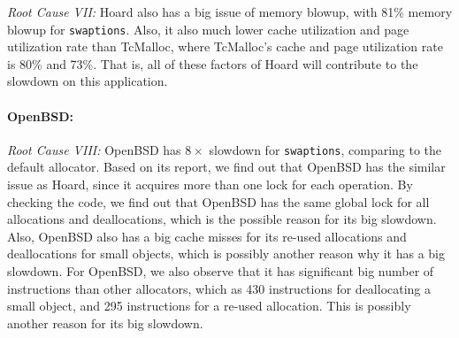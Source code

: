  \textit{Root Cause \RN{7}:} Hoard also has a big issue of memory blowup, with 81\% memory blowup for \texttt{swaptions}. Also, it also much lower cache utilization and page utilization rate than TcMalloc, where TcMalloc's cache and page utilization rate is 80\% and 73\%. That is, all of these factors of Hoard will contribute to the slowdown on this application.
 
\paragraph{OpenBSD:} \textit{Root Cause \RN{8}:}  OpenBSD has $8\times$ slowdown for \texttt{swaptions}, comparing to the default allocator. Based on its report, we find out that OpenBSD has the similar issue as Hoard, since it acquires more than one lock for each operation. By checking the code, we find out that OpenBSD has the same global lock for all allocations and deallocations, which is the possible reason for its big slowdown. Also, OpenBSD also has a big cache misses for its re-used allocations and deallocations for small objects, which is possibly another reason why it has a big slowdown. For OpenBSD, we also observe that it has significant big number of instructions than other allocators, which as 430 instructions for deallocating a small object, and 295 instructions for a re-used allocation. This is possibly another reason for its big slowdown. 








